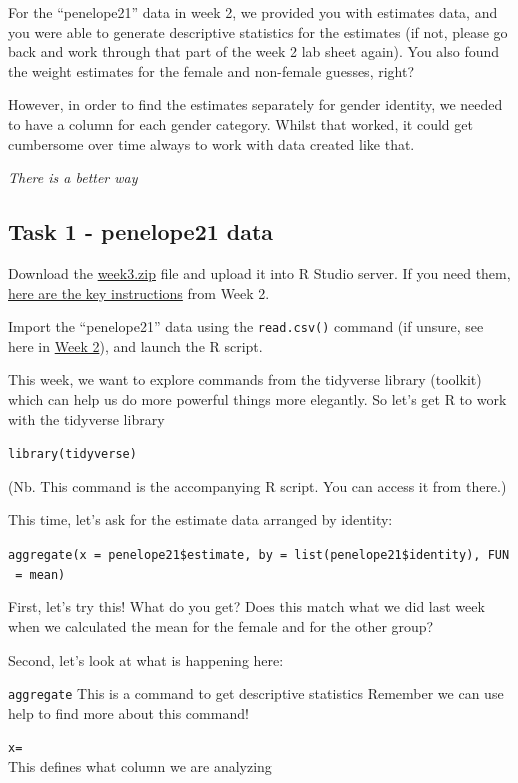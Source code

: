\documentclass[
]{book}
\begin{document}
For the ``penelope21'' data in week 2, we provided you with estimates data, and you were able to generate descriptive statistics for the estimates (if not, please go back and work through that part of the week 2 lab sheet again). You also found the weight estimates for the female and non-female guesses, right?

However, in order to find the estimates separately for gender identity, we needed to have a column for each gender category. Whilst that worked, it could get cumbersome over time always to work with data created like that.

\emph{There is a better way}

\hypertarget{task-1---penelope21-data}{%
\subsection{Task 1 - penelope21 data}\label{task-1---penelope21-data}}

Download the \href{files/Week_3/Week_3.zip}{week3.zip} file and upload it into R Studio server. If you need them, \protect\hyperlink{uploading_zip}{here are the key instructions} from Week 2.

Import the ``penelope21'' data using the \texttt{read.csv()} command (if unsure, see here in \protect\hyperlink{basic_script}{Week 2}), and launch the R script.

This week, we want to explore commands from the tidyverse library (toolkit) which can help us do more powerful things more elegantly. So let's get R to work with the tidyverse library

\texttt{library(tidyverse)}

(Nb. This command is the accompanying R script. You can access it from there.)

This time, let's ask for the estimate data arranged by identity:

\texttt{aggregate(x\ =\ penelope21\$estimate,\ by\ =\ list(penelope21\$identity),\ FUN\ =\ mean)}

First, let's try this! What do you get? Does this match what we did last week when we calculated the mean for the female and for the other group?

Second, let's look at what is happening here:

\texttt{aggregate} This is a command to get descriptive statistics
Remember we can use help to find more about this command!

\texttt{x=}~\\
This defines what column we are analyzing
\end{document}
